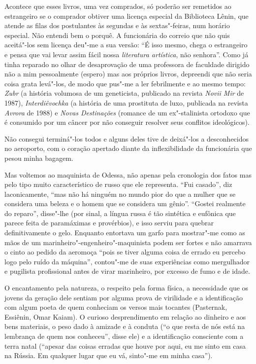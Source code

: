 Acontece que esses livros, uma vez comprados, só poderão ser remetidos
ao estrangeiro se o comprador obtiver uma licença especial da Biblioteca
Lênin, que atende as filas dos postulantes às segundas e às
sextas"-feiras, num horário especial. Não entendi bem o porquê. A
funcionária do correio que não quis aceitá"-los sem licença deu"-me a sua
versão: ``É isso mesmo, chega o estrangeiro e pensa que vai levar assim
fácil nossa \emph{literatura artística}, não senhora''. Como já tinha
reparado no olhar de desaprovação de uma professora de faculdade
dirigido não a mim pessoalmente (espero) mas aos próprios livros,
depreendi que não seria coisa grata levá"-los, de modo que pus"-me a ler
febrilmente e ao mesmo tempo: \emph{Zubr} (a história volumosa de um
geneticista, publicado na revista \emph{Novii Mir} de 1987),
\emph{Interdiêvochka} (a história de uma prostituta de luxo, publicada
na revista \emph{Avrora} de 1988) e \emph{Novas Destinações} (romance de
um ex"-stalinista ortodoxo que é consumido por um câncer por não
conseguir resolver seus conflitos ideológicos).

Não consegui terminá"-los todos e alguns deles tive de deixá"-los a
desconhecidos no aeroporto, com o coração apertado diante da
inflexibilidade da funcionária que pesou minha bagagem.

Mas voltemos ao maquinista de Odessa, não apenas pela cronologia dos
fatos mas pelo tipo muito característico de russo que ele representa.
``Fui casado'', diz laconicamente, ``mas não há ninguém no mundo pior do
que a mulher que se considera uma beleza e o homem que se considera um
gênio''. ``Gostei realmente do reparo'', disse"-lhe (por sinal, a língua
russa é tão sintética e eufônica que parece feita de paramáximas e
provérbios), e isso serviu para quebrar definitivamente o gelo. Enquanto
entortava um garfo para mostrar"-me como as mãos de um
marinheiro"-engenheiro"-maquinista podem ser fortes e não amarrava o cinto
ao pedido da aeromoça ``pois se tiver alguma coisa de errado eu percebo
logo pelo ruído da máquina'', contou"-me de suas experiências como
mergulhador e pugilista profissional antes de virar marinheiro, por
excesso de fumo e de idade.

O encantamento pela natureza, o respeito pela forma física, a
necessidade que os jovens da geração dele sentiam por alguma prova de
virilidade e a identificação com algum poeta de quem conheciam os versos
mais tocantes (Pasternak, Essiênin, Omar Kaiam). O curioso
desprendimento em relação ao dinheiro e aos bens materiais, o peso dado
à amizade e à conduta (``o que resta de nós está na lembrança de quem
nos conheceu'', disse ele) e a identificação consciente com a terra natal
(``apesar das coisas erradas que houve por aqui, eu me sinto em casa na
Rússia. Em qualquer lugar que eu vá, sinto"-me em minha casa'').

